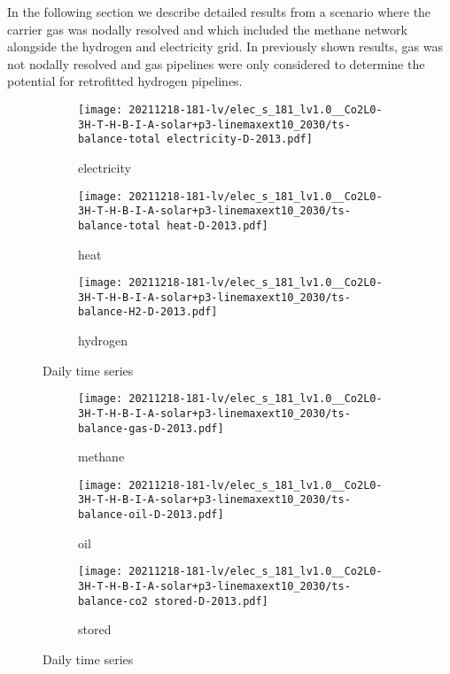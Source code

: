 In the following section we describe detailed results from a scenario where the
carrier gas was nodally resolved and which included the methane network
alongside the hydrogen and electricity grid. In previously shown results, gas
was not nodally resolved and gas pipelines were only considered to determine the
potential for retrofitted hydrogen pipelines.

\begin{figure}
    \centering
    \begin{subfigure}[t]{\textwidth}
        \centering
        \caption{electricity}
        \texttt{[image: 20211218-181-lv/elec\_s\_181\_lv1.0\_\_Co2L0-3H-T-H-B-I-A-solar+p3-linemaxext10\_2030/ts-balance-total electricity-D-2013.pdf]}
    \end{subfigure}
    \begin{subfigure}[t]{\textwidth}
        \centering
        \caption{heat}
        \texttt{[image: 20211218-181-lv/elec\_s\_181\_lv1.0\_\_Co2L0-3H-T-H-B-I-A-solar+p3-linemaxext10\_2030/ts-balance-total heat-D-2013.pdf]}
    \end{subfigure}
    \begin{subfigure}[t]{\textwidth}
        \centering
        \caption{hydrogen}
        \texttt{[image: 20211218-181-lv/elec\_s\_181\_lv1.0\_\_Co2L0-3H-T-H-B-I-A-solar+p3-linemaxext10\_2030/ts-balance-H2-D-2013.pdf]}
    \end{subfigure}
    \caption{Daily time series}
    \label{fig:output-ts-1}
\end{figure}

\begin{figure}
    \centering
    \begin{subfigure}[t]{\textwidth}
        \centering
        \caption{methane}
        \texttt{[image: 20211218-181-lv/elec\_s\_181\_lv1.0\_\_Co2L0-3H-T-H-B-I-A-solar+p3-linemaxext10\_2030/ts-balance-gas-D-2013.pdf]}
    \end{subfigure}
    \begin{subfigure}[t]{\textwidth}
        \centering
        \caption{oil}
        \texttt{[image: 20211218-181-lv/elec\_s\_181\_lv1.0\_\_Co2L0-3H-T-H-B-I-A-solar+p3-linemaxext10\_2030/ts-balance-oil-D-2013.pdf]}
    \end{subfigure}
    \begin{subfigure}[t]{\textwidth}
        \centering
        \caption{stored \co}
        \texttt{[image: 20211218-181-lv/elec\_s\_181\_lv1.0\_\_Co2L0-3H-T-H-B-I-A-solar+p3-linemaxext10\_2030/ts-balance-co2 stored-D-2013.pdf]}
    \end{subfigure}
    \caption{Daily time series}
    \label{fig:output-ts-2}
\end{figure}


